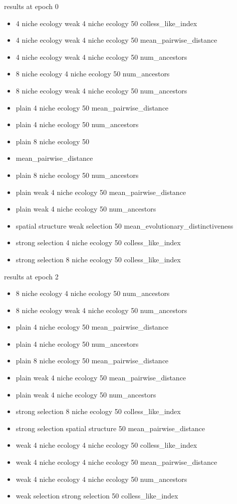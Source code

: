 results at epoch 0
\begin{itemize}
\item 4 niche ecology	weak 4 niche ecology	50	colless_like_index
\item 4 niche ecology	weak 4 niche ecology	50	mean_pairwise_distance
\item 4 niche ecology	weak 4 niche ecology	50	num_ancestors
\item 8 niche ecology	4 niche ecology	50	num_ancestors
\item 8 niche ecology	weak 4 niche ecology	50	num_ancestors
\item plain	4 niche ecology	50	mean_pairwise_distance
\item plain	4 niche ecology	50	num_ancestors
\item plain	8 niche ecology	50
\item mean_pairwise_distance
\item plain	8 niche ecology	50	num_ancestors
\item plain	weak 4 niche ecology	50	mean_pairwise_distance
\item plain	weak 4 niche ecology	50	num_ancestors
\item spatial structure	weak selection	50	mean_evolutionary_distinctiveness
\item strong selection	4 niche ecology	50	colless_like_index
\item strong selection	8 niche ecology	50	colless_like_index

\end{itemize}

results at epoch 2 
\begin{itemize}
    \item 8 niche ecology	4 niche ecology	50	num_ancestors
    \item 8 niche ecology	weak 4 niche ecology	50	num_ancestors
    \item plain	4 niche ecology	50	mean_pairwise_distance
    \item plain	4 niche ecology	50	num_ancestors
    \item plain	8 niche ecology	50	mean_pairwise_distance
    \item plain	weak 4 niche ecology	50	mean_pairwise_distance
    \item plain	weak 4 niche ecology	50	num_ancestors
    \item strong selection	8 niche ecology	50	colless_like_index
\item strong selection	spatial structure	50	mean_pairwise_distance
\item weak 4 niche ecology	4 niche ecology	50	colless_like_index
\item weak 4 niche ecology	4 niche ecology	50	mean_pairwise_distance
\item weak 4 niche ecology	4 niche ecology	50	num_ancestors
\item weak selection	strong selection	50	colless_like_index

\end{itemize}

